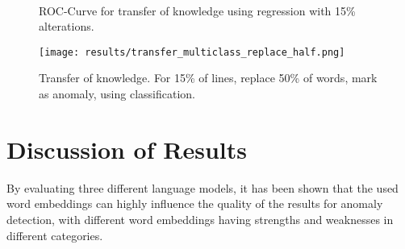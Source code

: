 \begin{figure*}[ht!]
\hspace{\fill}
\hspace{\fill}
   \\
\caption{\label{fig:results_transfer_multiclass_roc}ROC-Curve for transfer of knowledge using regression with 15\% alterations.}
\end{figure*}
\clearpage
\begin{figure}[h]
  \centering
  \captionsetup{justification=centering}
  \texttt{[image: results/transfer\_multiclass\_replace\_half.png]}\\
  \caption{Transfer of knowledge. For 15\% of lines, replace 50\% of words, mark as anomaly, using classification.}
  \label{fig:replace_words_classification_transfer}
\end{figure}


\section{Discussion of Results\label{sec:discussion_results}}
By evaluating three different language models, it has been shown that the used word embeddings can highly influence the quality of the results for anomaly detection, with different word embeddings having strengths and weaknesses in different categories. 

\begin{comment}
For anomaly detection on one dataset using the regression approach, GPT-2 shows strong results, with F1-Scores of 0.95 when altering 5\% of log sequences, and 0.93 when altering the log lines, the quality of the results don't degrade much, when alteration ratios are increased, where Bert and XL-Transformers show decreases of 0.1 to 0.2 percentage points when increasing the alteration ratio from 5\% to 15\%. Yet, when the log events are completely reversed, GPT-2 achieves an F1-Score of only 0.55, where Bert and XL achieve 0.98, almost perfectly detecting the wrong sequence of log events.
\end{comment}

